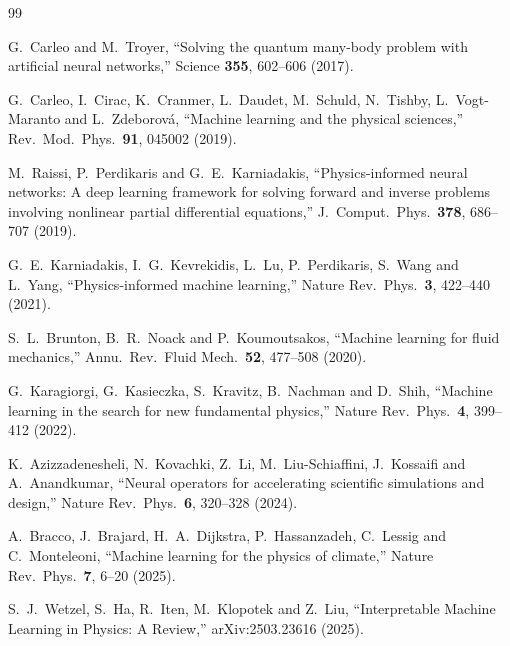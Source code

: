 \documentclass[11pt,a4paper,oneside]{book}
\begin{document}


\begin{thebibliography}{99}

G.~Carleo and M.~Troyer,
``Solving the quantum many-body problem with artificial neural networks,''
Science \textbf{355}, 602--606 (2017).

G.~Carleo, I.~Cirac, K.~Cranmer, L.~Daudet, M.~Schuld,
N.~Tishby, L.~Vogt-Maranto and L.~Zdeborov\'a,
``Machine learning and the physical sciences,''
Rev.\ Mod.\ Phys.\ \textbf{91}, 045002 (2019).

M.~Raissi, P.~Perdikaris and G.~E.~Karniadakis,
``Physics-informed neural networks: A deep learning framework for solving
forward and inverse problems involving nonlinear partial differential
equations,''
J.\ Comput.\ Phys.\ \textbf{378}, 686--707 (2019).

G.~E.~Karniadakis, I.~G.~Kevrekidis, L.~Lu, P.~Perdikaris,
S.~Wang and L.~Yang,
``Physics-informed machine learning,''
Nature Rev.\ Phys.\ \textbf{3}, 422--440 (2021).

S.~L.~Brunton, B.~R.~Noack and P.~Koumoutsakos,
``Machine learning for fluid mechanics,''
Annu.\ Rev.\ Fluid Mech.\ \textbf{52}, 477--508 (2020).

G.~Karagiorgi, G.~Kasieczka, S.~Kravitz, B.~Nachman and D.~Shih,
``Machine learning in the search for new fundamental physics,''
Nature Rev.\ Phys.\ \textbf{4}, 399--412 (2022).

K.~Azizzadenesheli, N.~Kovachki, Z.~Li, M.~Liu-Schiaffini,
J.~Kossaifi and A.~Anandkumar,
``Neural operators for accelerating scientific simulations and design,''
Nature Rev.\ Phys.\ \textbf{6}, 320--328 (2024).

A.~Bracco, J.~Brajard, H.~A.~Dijkstra, P.~Hassanzadeh,
C.~Lessig and C.~Monteleoni,
``Machine learning for the physics of climate,''
Nature Rev.\ Phys.\ \textbf{7}, 6--20 (2025).

S.~J.~Wetzel, S.~Ha, R.~Iten, M.~Klopotek and Z.~Liu,
``Interpretable Machine Learning in Physics: A Review,''
arXiv:2503.23616 (2025).


\end{thebibliography}
\end{document}

